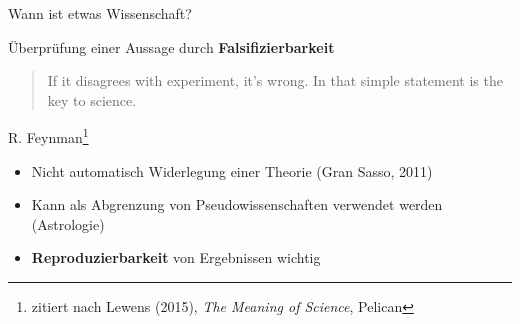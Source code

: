 \documentclass{beamer}
\begin{document}
\begin{frame}{Wann ist etwas Wissenschaft?}

    Überprüfung einer Aussage durch \textbf{Falsifizierbarkeit}
    \begin{quote}
        If it disagrees with experiment, it's wrong. In that simple statement is
        the key to science.
    \end{quote}

    {\ft\hfill R. Feynman\footnote{%
    zitiert nach Lewens (2015), \emph{The Meaning of Science},
    Pelican}\hspace{1cm}}

    \vspace{1cm}

    \begin{itemize}
        \item Nicht automatisch Widerlegung einer Theorie (Gran Sasso, 2011)
        \item Kann als Abgrenzung von Pseudowissenschaften verwendet werden
            (Astrologie)
        \item \textbf{Reproduzierbarkeit} von Ergebnissen wichtig
    \end{itemize}

\end{frame}
\end{document}

